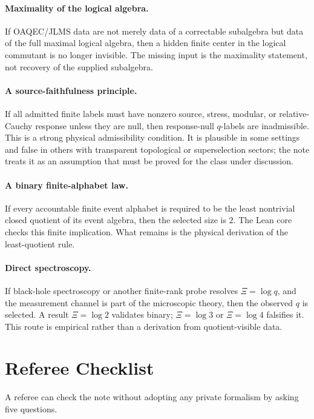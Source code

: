 \documentclass[12pt]{article}
\theoremstyle{definition}
\theoremstyle{remark}
\begin{document}
\paragraph{Maximality of the logical algebra.}
If OAQEC/JLMS data are not merely data of a correctable subalgebra but data of
the full maximal logical algebra, then a hidden finite center in the logical
commutant is no longer invisible.  The missing input is the maximality
statement, not recovery of the supplied subalgebra.

\paragraph{A source-faithfulness principle.}
If all admitted finite labels must have nonzero source, stress, modular, or
relative-Cauchy response unless they are null, then response-null \(q\)-labels
are inadmissible.  This is a strong physical admissibility condition.  It is
plausible in some settings and false in others with transparent topological or
superselection sectors; the note treats it as an assumption that must be
proved for the class under discussion.

\paragraph{A binary finite-alphabet law.}
If every accountable finite event alphabet is required to be the least
nontrivial closed quotient of its event algebra, then the selected size is
\(2\).  The Lean core checks this finite implication.  What remains is the
physical derivation of the least-quotient rule.

\paragraph{Direct spectroscopy.}
If black-hole spectroscopy or another finite-rank probe resolves
\(\Xi=\log q\), and the measurement channel is part of the microscopic theory,
then the observed \(q\) is selected.  A result \(\Xi=\log2\) validates binary;
\(\Xi=\log3\) or \(\Xi=\log4\) falsifies it.  This route is empirical rather
than a derivation from quotient-visible data.

\section{Referee Checklist}

A referee can check the note without adopting any private formalism by asking
five questions.
\end{document}
